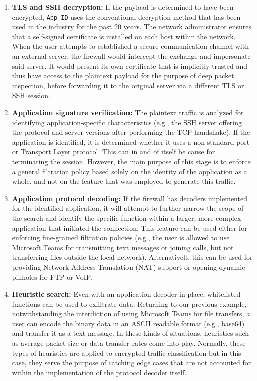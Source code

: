 \begin{enumerate}
    \item \textbf{TLS and SSH decryption:} If the payload is determined to have
    been encrypted, \texttt{App-ID} uses the conventional decryption method that
    has been used in the industry for the past 20 years. The network administrator
    ensures that a self-signed certificate is installed on each host within the
    network. When the user attempts to established a secure communication
    channel with an external server, the firewall would intercept the exchange
    and impersonate said server. It would present its own certificate that is
    implicitly trusted and thus have access to the plaintext payload for the
    purpose of deep packet inspection, before forwarding it to the original
    server via a different TLS or SSH session.

    \item \textbf{Application signature verification:} The plaintext traffic is
    analyzed for identifying application-specific characteristics (e.g., the
    SSH server offering the protocol and server versions after performing the
    TCP handshake). If the application is identified, it is determined whether
    it uses a non-standard port or Transport Layer protocol. This can in and of
    itself be cause for terminating the session. However, the main purpose of
    this stage is to enforce a general filtration policy based solely on the
    identity of the application as a whole, and not on the feature that was
    employed to generate this traffic.

    \item \textbf{Application protocol decoding:} If the firewall has decoders
    implemented for the identified application, it will attempt to further
    narrow the scope of the search and identify the specific function within
    a larger, more complex application that initiated the connection. This feature
    can be used either for enforcing fine-grained filtration policies (e.g., the
    user is allowed to use Microsoft Teams for transmitting text messages or
    joining calls, but not transferring files outside the local network).
    Alternativelt, this can be used for providing Network Address Translation (NAT)
    support or opening dynamic pinholes for FTP or VoIP.

    \item \textbf{Heuristic search:} Even with an application decoder in place,
    whitelisted functions can be used to exfiltrate data. Returning to our
    previous example, notwithstanding the interdiction of using Microsoft Teams
    for file transfers, a user can encode the binary data in an ASCII readable
    format (e.g., base64) and transfer it as a text message. In these kinds of
    situations, heuristics such as average packet size or data transfer rates
    come into play. Normally, these types of heuristics are applied to encrypted
    traffic classification but in this case, they serve the purpose of catching
    edge cases that are not accounted for within the implementation of the
    protocol decoder itself.
\end{enumerate}

